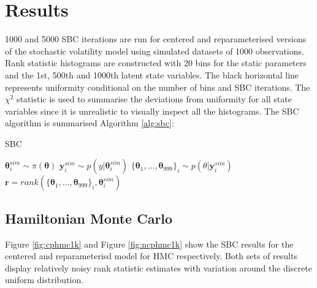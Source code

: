 \documentclass[12pt, a4paper]{article}
\begin{document}



\section{Results}
    1000 and 5000 SBC iterations are run for centered and reparameterised versions of the stochastic volatility model using simulated datasets of 1000 observations. Rank statistic histograms are constructed with 20 bins for the static parameters and the 1st, 500th and 1000th latent state variables. The black horizontal line represents uniformity conditional on the number of bins and SBC iterations. The $\chi^2$ statistic is used to summarise the deviations from uniformity for all state variables since it is unrealistic to visually inspect all the histograms. The SBC algorithm is summarised Algorithm \ref{alg:sbc}:

    \begin{algorithm}
        \caption{SBC}\label{alg:sbc}
        \begin{algorithmic}
                \State {} $\boldsymbol{\theta}^{sim}_i \sim\pi (\boldsymbol{\theta})$
                \State {} $\boldsymbol{y}^{sim}_i \sim p(y|\boldsymbol{\theta}^{sim}_i)$
                \State {} $\{\boldsymbol{\theta}_1,\dots , \boldsymbol{\theta}_{999}\}_i \sim p(\theta | \boldsymbol{y}^{sim}_i)$
                \State {} $\boldsymbol{r} = rank(\{\boldsymbol{\theta}_1,\dots , \boldsymbol{\theta}_{999}\}_i, \boldsymbol{\theta}^{sim}_i)$
              \EndFor
        \end{algorithmic}
        \end{algorithm}
        
    \subsection{Hamiltonian Monte Carlo}
    Figure \ref{fig:cphmc1k} and Figure \ref{fig:ncphmc1k} show the SBC results for the centered and reparameterisd model for HMC respectively. Both sets of results display relatively noisy rank statistic estimates with variation around the discrete uniform distribution.
\end{document}
